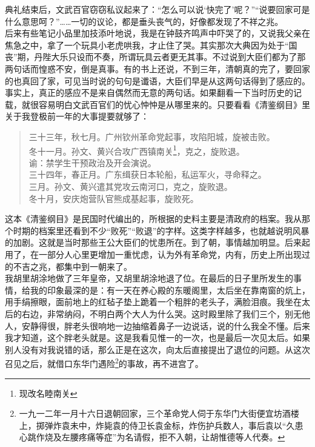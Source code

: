 典礼结束后，文武百官窃窃私议起来了：“怎么可以说‘快完了’呢？”“说要回家可是什么意思呵？”……一切的议论，都是垂头丧气的，好像都发现了不祥之兆。\\

后来有些笔记小品里加技添叶地说，我是在钟鼓齐鸣声中吓哭了的，又说我父亲在焦急之中，拿了一个玩具小老虎哄我，才止住了哭。其实那次大典因为处于“国丧”期，丹陛大乐只设而不奏，所谓玩具云者更无其事。不过说到大臣们都为了那两句话而惶惑不安，倒是真事。有的书上还说，不到三年，清朝真的完了，要回家的也真回了家，可见当时说的句句是谶语，大臣们早是从这两句话得到了感应的。\\

事实上，真正的感应不是来自偶然而无意的两句话。如果翻看一下当时历史的记载，就很容易明白文武百官们的忧心忡忡是从哪里来的。只要看看《清鉴纲目》里关于我登极前一年的大事提要就够了：\\

\begin{quote}
	三十三年，秋七月。广州钦州革命党起事，攻陷阳城，旋被击败。\\

冬十一月。孙文、黄兴合攻广西镇南关\footnote{现改名睦南关}，克之，旋败退。\\

谕：禁学生干预政治及开会演说。\\

三十四年，春正月。广东缉获日本轮船，私运军火，寻命释之。\\

三月。孙文、黄兴遣其党攻云南河口，克之，旋败退。\\

冬十月，安庆炮营队官熊成基起事，旋败死。\\
\end{quote}

这本《清鉴纲目》是民国时代编出的，所根据的史料主要是清政府的档案。我从那个时期的档案里还看到不少“败死”“败退”的字样。这类字样越多，也就越说明风暴的加剧。这就是当时那些王公大臣们的忧患所在。到了朝，事情越加明显。后来起用了，在一部分人心里更增加一重忧虑，认为外有革命党，内有，历史上所出现过的不吉之兆，都集中到一朝来了。\\

我胡里胡涂地做了三年皇帝，又胡里胡涂地退了位。在最后的日子里所发生的事情，给我的印象最深的是：有一天在养心殿的东暖阁里，太后坐在靠南窗的炕上，用手绢擦眼，面前地上的红毡子垫上跪着一个粗胖的老头子，满脸泪痕。我坐在太后的右边，非常纳闷，不明白两个大人为什么哭。这时殿里除了我们三个，别无他人，安静得很，胖老头很响地一边抽缩着鼻子一边说话，说的什么我全不懂。后来我才知道，这个胖老头就是。这是我看见惟一的一次，也是最后一次见太后。如果别人没有对我说错的话，那么正是在这次，向太后直接提出了退位的问题。从这次召见之后，就借口东华门遇险\footnote{一九一二年一月十六日退朝回家，三个革命党人伺于东华门大街便宜坊酒楼上，掷弹炸袁未中，炸毙袁的侍卫长袁金标，炸伤护兵数人，事后袁以“久患心跳作烧及左腰疼痛等症”为名请假，拒不入朝，让胡惟德等人代奏。}的事故，再不进宫了。\\


